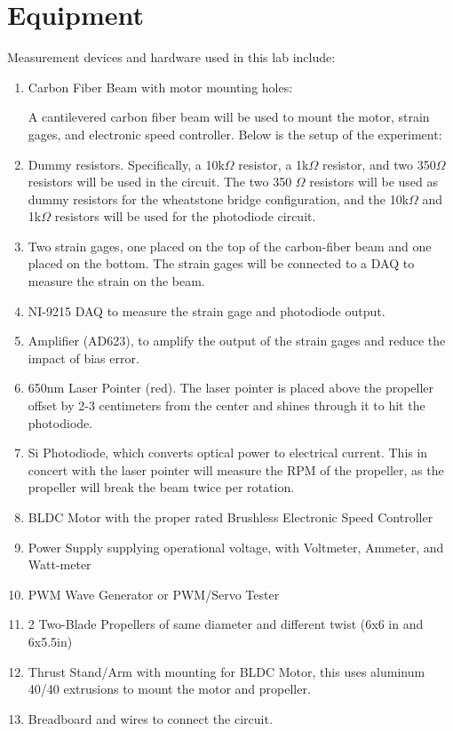 \documentclass{article}
\begin{document}
\section{Equipment}

Measurement devices and hardware used in this lab include:
\begin{enumerate}
  \item Carbon Fiber Beam with motor mounting holes:
  \vspace{1mm}

  A cantilevered carbon fiber beam will be used to mount the motor, strain gages, and electronic speed controller. Below is the setup of the experiment:



  \vspace{2.5mm}

  \item Dummy resistors. Specifically, a 10k$\Omega$ resistor, a 1k$\Omega$ resistor, and two 350$\Omega$ resistors will be used in the circuit. The two 350 $\Omega$ resistors will be used as dummy resistors for the wheatstone bridge configuration, and the 10k$\Omega$ and 1k$\Omega$ resistors will be used for the photodiode circuit.
  \item Two strain gages, one placed on the top of the carbon-fiber beam and one placed on the bottom. The strain gages will be connected to a DAQ to measure the strain on the beam.
  \item NI-9215 DAQ to measure the strain gage and photodiode output.
  \item Amplifier (AD623), to amplify the output of the strain gages and reduce the impact of bias error.
  \item 650nm Laser Pointer (red). The laser pointer is placed above the propeller offset by 2-3 centimeters from the center and shines through it to hit the photodiode.
  \item Si Photodiode, which converts optical power to electrical current. This in concert with the laser pointer will measure the RPM of the propeller, as the propeller will break the beam twice per rotation.
  \item BLDC Motor with the proper rated Brushless Electronic Speed Controller 
  \item Power Supply supplying operational voltage, with Voltmeter, Ammeter, and Watt-meter
  \item PWM Wave Generator or PWM/Servo Tester
  \item 2 Two-Blade Propellers of same diameter and different twist (6x6 in and 6x5.5in)
  \item Thrust Stand/Arm with mounting for BLDC Motor, this uses aluminum 40/40 extrusions to mount the motor and propeller.
  \item Breadboard and wires to connect the circuit.
\end{enumerate}
\end{document}
